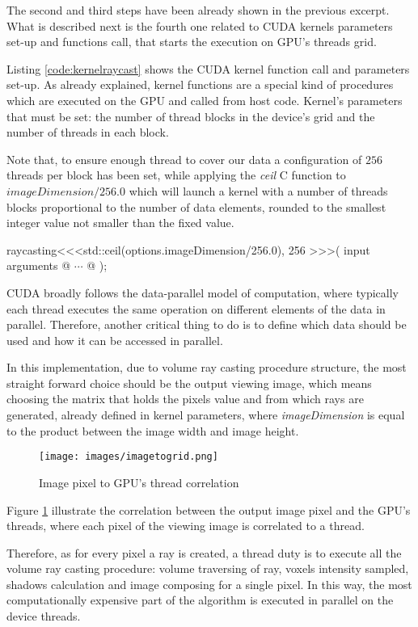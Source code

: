 \documentclass[12pt,a4paper]{extarticle}
\newcommand{\linespace}{\vspace{8pt}}
\begin{document}
The second and third steps have been already shown in the previous excerpt. What is described next is the fourth one related to CUDA kernels parameters set-up and functions call, that starts the execution on GPU's threads grid.
\linespace

Listing \ref{code:kernelraycast} shows the CUDA kernel function call and parameters set-up. As already explained, kernel functions are a special kind of procedures which are executed on the GPU and called from host code. Kernel's parameters that must be set: the number of thread blocks in the device's grid and the number of threads in each block. 

Note that, to ensure enough thread to cover our data a configuration of $256$ threads per block has been set, while applying the \textit{ceil} C function to $imageDimension/256.0$ which will launch a kernel with a number of threads blocks proportional to the number of data elements, rounded to the smallest integer value not smaller than the fixed value.

\begin{cpp}[label=code:kernelraycast]
raycasting<<<std::ceil(options.imageDimension/256.0), 256 >>>( 
	input arguments @ $\cdots$ @
	);	
\end{cpp}

CUDA broadly follows the data-parallel model of computation, where typically each thread executes the same operation on different elements of the data in parallel. Therefore, another critical thing to do is to define which data should be used and how it can be accessed in parallel.

In this implementation, due to volume ray casting procedure structure, the most straight forward choice should be the output viewing image, which means choosing the matrix that holds the pixels value and from which rays are generated, already defined in kernel parameters, where \textit{imageDimension} is equal to the product between the image width and image height.

\begin{figure}[hbtp]
\centering
\texttt{[image: images/imagetogrid.png]}
\caption{Image pixel to GPU's thread correlation}
\label{fig:imagetogrid}
\end{figure}

Figure \ref{fig:imagetogrid} illustrate the correlation between the output image pixel and the GPU's threads, where each pixel of the viewing image is correlated to a thread. 

Therefore, as for every pixel a ray is created, a thread duty is to execute all the volume ray casting procedure: volume traversing of ray, voxels intensity sampled, shadows calculation and image composing for a single pixel.
In this way, the most computationally expensive part of the algorithm is executed in parallel on the device threads.
\linespace
\end{document}
